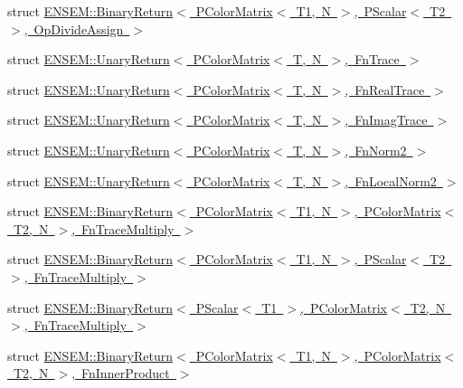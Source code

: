 \begin{DoxyCompactItemize}
\item 
struct \mbox{\hyperlink{structENSEM_1_1BinaryReturn_3_01PColorMatrix_3_01T1_00_01N_01_4_00_01PScalar_3_01T2_01_4_00_01OpDivideAssign_01_4}{E\+N\+S\+E\+M\+::\+Binary\+Return$<$ P\+Color\+Matrix$<$ T1, N $>$, P\+Scalar$<$ T2 $>$, Op\+Divide\+Assign $>$}}
\item 
struct \mbox{\hyperlink{structENSEM_1_1UnaryReturn_3_01PColorMatrix_3_01T_00_01N_01_4_00_01FnTrace_01_4}{E\+N\+S\+E\+M\+::\+Unary\+Return$<$ P\+Color\+Matrix$<$ T, N $>$, Fn\+Trace $>$}}
\item 
struct \mbox{\hyperlink{structENSEM_1_1UnaryReturn_3_01PColorMatrix_3_01T_00_01N_01_4_00_01FnRealTrace_01_4}{E\+N\+S\+E\+M\+::\+Unary\+Return$<$ P\+Color\+Matrix$<$ T, N $>$, Fn\+Real\+Trace $>$}}
\item 
struct \mbox{\hyperlink{structENSEM_1_1UnaryReturn_3_01PColorMatrix_3_01T_00_01N_01_4_00_01FnImagTrace_01_4}{E\+N\+S\+E\+M\+::\+Unary\+Return$<$ P\+Color\+Matrix$<$ T, N $>$, Fn\+Imag\+Trace $>$}}
\item 
struct \mbox{\hyperlink{structENSEM_1_1UnaryReturn_3_01PColorMatrix_3_01T_00_01N_01_4_00_01FnNorm2_01_4}{E\+N\+S\+E\+M\+::\+Unary\+Return$<$ P\+Color\+Matrix$<$ T, N $>$, Fn\+Norm2 $>$}}
\item 
struct \mbox{\hyperlink{structENSEM_1_1UnaryReturn_3_01PColorMatrix_3_01T_00_01N_01_4_00_01FnLocalNorm2_01_4}{E\+N\+S\+E\+M\+::\+Unary\+Return$<$ P\+Color\+Matrix$<$ T, N $>$, Fn\+Local\+Norm2 $>$}}
\item 
struct \mbox{\hyperlink{structENSEM_1_1BinaryReturn_3_01PColorMatrix_3_01T1_00_01N_01_4_00_01PColorMatrix_3_01T2_00_01N_01_4_00_01FnTraceMultiply_01_4}{E\+N\+S\+E\+M\+::\+Binary\+Return$<$ P\+Color\+Matrix$<$ T1, N $>$, P\+Color\+Matrix$<$ T2, N $>$, Fn\+Trace\+Multiply $>$}}
\item 
struct \mbox{\hyperlink{structENSEM_1_1BinaryReturn_3_01PColorMatrix_3_01T1_00_01N_01_4_00_01PScalar_3_01T2_01_4_00_01FnTraceMultiply_01_4}{E\+N\+S\+E\+M\+::\+Binary\+Return$<$ P\+Color\+Matrix$<$ T1, N $>$, P\+Scalar$<$ T2 $>$, Fn\+Trace\+Multiply $>$}}
\item 
struct \mbox{\hyperlink{structENSEM_1_1BinaryReturn_3_01PScalar_3_01T1_01_4_00_01PColorMatrix_3_01T2_00_01N_01_4_00_01FnTraceMultiply_01_4}{E\+N\+S\+E\+M\+::\+Binary\+Return$<$ P\+Scalar$<$ T1 $>$, P\+Color\+Matrix$<$ T2, N $>$, Fn\+Trace\+Multiply $>$}}
\item 
struct \mbox{\hyperlink{structENSEM_1_1BinaryReturn_3_01PColorMatrix_3_01T1_00_01N_01_4_00_01PColorMatrix_3_01T2_00_01N_01_4_00_01FnInnerProduct_01_4}{E\+N\+S\+E\+M\+::\+Binary\+Return$<$ P\+Color\+Matrix$<$ T1, N $>$, P\+Color\+Matrix$<$ T2, N $>$, Fn\+Inner\+Product $>$}}

\end{DoxyCompactItemize}
